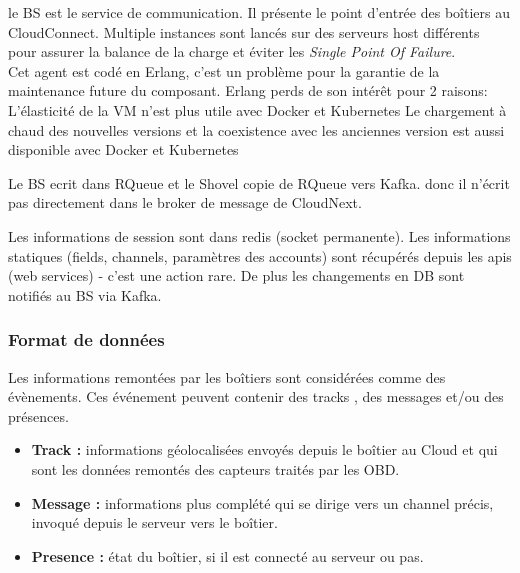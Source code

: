         le \gls{BS} est le service de communication. Il présente le point d'entrée des boîtiers au CloudConnect. 
            Multiple instances sont lancés sur des serveurs host différents pour assurer la balance de la charge 
            et éviter les \textit{Single Point Of Failure}. \\
        Cet agent est codé en Erlang, c’est un problème pour la garantie de la maintenance future du composant.
        Erlang perds de son intérêt pour 2 raisons:
            L'élasticité de la VM n’est plus utile avec Docker et Kubernetes
            Le chargement à chaud des nouvelles versions et la coexistence avec les anciennes version est aussi 
            disponible avec Docker et Kubernetes

        Le BS ecrit dans RQueue et le Shovel copie de RQueue vers Kafka. donc il n'écrit pas directement dans le broker de message de CloudNext.


        Les informations de session sont dans redis (socket permanente).
        Les informations statiques (fields, channels, paramètres des accounts) sont récupérés depuis les apis (web services) - c’est une action rare.
        De plus les changements en DB sont notifiés au BS via Kafka.

        \subsubsection{Format de données}
        Les informations remontées par les boîtiers sont considérées comme des évènements. Ces événement peuvent contenir 
        des tracks , des messages et/ou des présences.\\
        \begin{itemize}
            \renewcommand{\labelitemi}{$\bullet$}
            \item \textbf{Track :} informations géolocalisées envoyés depuis le boîtier au Cloud et qui sont les données remontés des capteurs traités par les OBD. \\
            \item \textbf{Message :} informations plus complété qui se dirige vers un channel précis, invoqué depuis le serveur vers le boîtier.\\
            \item \textbf{Presence :} état du boîtier, si il est connecté au serveur ou pas.\\
        \end{itemize}

